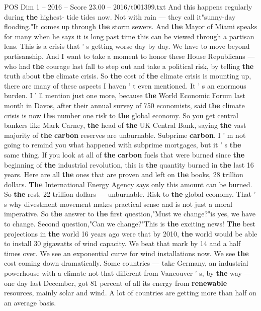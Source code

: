 \begin{textsample}{POS Dim 1 – 2016 – Score 23.00 – 2016/t001399.txt}
And this happens regularly during \textbf{the} highest- tide tides now.
Not with rain — they call it"sunny-day flooding."It comes up through \textbf{the} storm sewers.
And \textbf{the} Mayor of Miami speaks for many when he says it is long past time this can be viewed through a partisan lens.
This is a crisis that ' s getting worse day by day.
We have to move beyond partisanship.
And I want to take a moment to honor these House Republicans — who had \textbf{the} courage last fall to step out and take a political risk, by telling \textbf{the} truth about \textbf{the} climate crisis.
So \textbf{the} cost of \textbf{the} climate crisis is mounting up, there are many of these aspects I haven ' t even mentioned.
It ' s an enormous burden.
I ' ll mention just one more, because \textbf{the} World Economic Forum last month in Davos, after their annual survey of 750 economists, said \textbf{the} climate crisis is now \textbf{the} number one risk to \textbf{the} global economy.
So you get central bankers like Mark Carney, \textbf{the} head of \textbf{the} UK Central Bank, saying \textbf{the} vast majority of \textbf{the} \textbf{carbon} reserves are unburnable.
Subprime \textbf{carbon}.
I ' m not going to remind you what happened with subprime mortgages, but it ' s \textbf{the} same thing.
If you look at all of \textbf{the} \textbf{carbon} fuels that were burned since \textbf{the} beginning of \textbf{the} industrial revolution, this is \textbf{the} quantity burned in \textbf{the} last 16 years.
Here are all \textbf{the} ones that are proven and left on \textbf{the} books, 28 trillion dollars. \textbf{The} International Energy Agency says only this amount can be burned.
So \textbf{the} rest, 22 trillion dollars — unburnable.
Risk to \textbf{the} global economy.
That ' s why divestment movement makes practical sense and is not just a moral imperative.
So \textbf{the} answer to \textbf{the} first question,"Must we change?"is yes, we have to change.
Second question,"Can we change?"This is \textbf{the} exciting news! \textbf{The} best projections in \textbf{the} world 16 years ago were that by 2010, \textbf{the} world would be able to install 30 gigawatts of wind capacity.
We beat that mark by 14 and a half times over.
We see an exponential curve for wind installations now.
We see \textbf{the} cost coming down dramatically.
Some countries — take Germany, an industrial powerhouse with a climate not that different from Vancouver ' s, by \textbf{the} way — one day last December, got 81 percent of all its energy from \textbf{renewable} resources, mainly solar and wind.
A lot of countries are getting more than half on an average basis.

\end{textsample}
